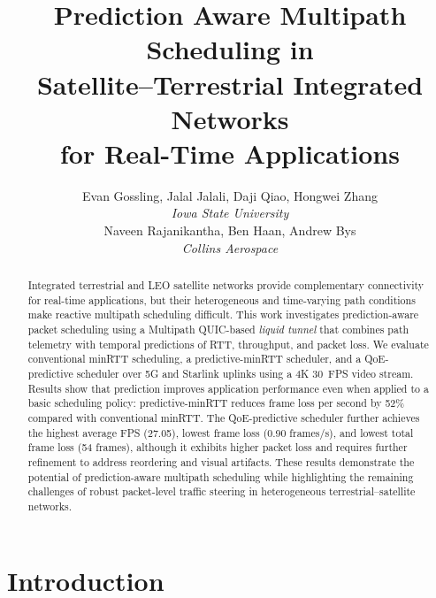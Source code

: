 \documentclass[sigconf,nonacm]{acmart}
\title{Prediction Aware Multipath Scheduling in\\Satellite--Terrestrial Integrated Networks\\for Real-Time Applications}
\author{
    Evan Gossling, Jalal Jalali, Daji Qiao, Hongwei Zhang
    \\
    \textit{Iowa State University}
    \\[1em]
    Naveen Rajanikantha, Ben Haan, Andrew Bys
    \\
    \textit{Collins Aerospace}
}
\begin{document}
\begin{abstract}
Integrated terrestrial and LEO satellite networks provide complementary connectivity for real-time applications, but their heterogeneous and time-varying path conditions make reactive multipath scheduling difficult. This work investigates prediction-aware packet scheduling using a Multipath QUIC-based \emph{liquid tunnel} that combines path telemetry with temporal predictions of RTT, throughput, and packet loss. We evaluate conventional minRTT scheduling, a predictive-minRTT scheduler, and a QoE-predictive scheduler over 5G and Starlink uplinks using a 4K 30~FPS video stream. Results show that prediction improves application performance even when applied to a basic scheduling policy: predictive-minRTT reduces frame loss per second by 52\% compared with conventional minRTT. The QoE-predictive scheduler further achieves the highest average FPS (27.05), lowest frame loss (0.90 frames/s), and lowest total frame loss (54 frames), although it exhibits higher packet loss and requires further refinement to address reordering and visual artifacts. These results demonstrate the potential of prediction-aware multipath scheduling while highlighting the remaining challenges of robust packet-level traffic steering in heterogeneous terrestrial--satellite networks.
\end{abstract}

\maketitle


\section{Introduction}
\end{document}
